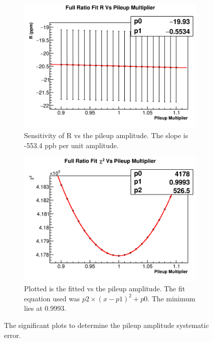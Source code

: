 		\begin{figure}[h]
		\centering
		    \begin{subfigure}[t]{0.45\textwidth}
			    \centering
				\includegraphics[width=\textwidth]{RatioCBO_R_Vs_PileupMultiplier_Canv}
			    \caption{Sensitivity of R vs the pileup amplitude. The slope is -553.4 ppb per unit amplitude.}
		    \end{subfigure}
		    \hspace{4mm}
		    \begin{subfigure}[t]{0.45\textwidth}
			    \centering
				\includegraphics[width=\textwidth]{RatioCBO_Chi2_Vs_PileupMultiplier_Canv}
			    \caption{Plotted is the fitted \chisq vs the pileup amplitude. The fit equation used was $p2 \times (x - p1)^{2} + p0.$ The minimum lies at 0.9993.}
		    \end{subfigure}
		\caption[PileupMultiplier]{The significant plots to determine the pileup amplitude systematic error.}
		\label{fig:PileupMultiplier}
		\end{figure}

